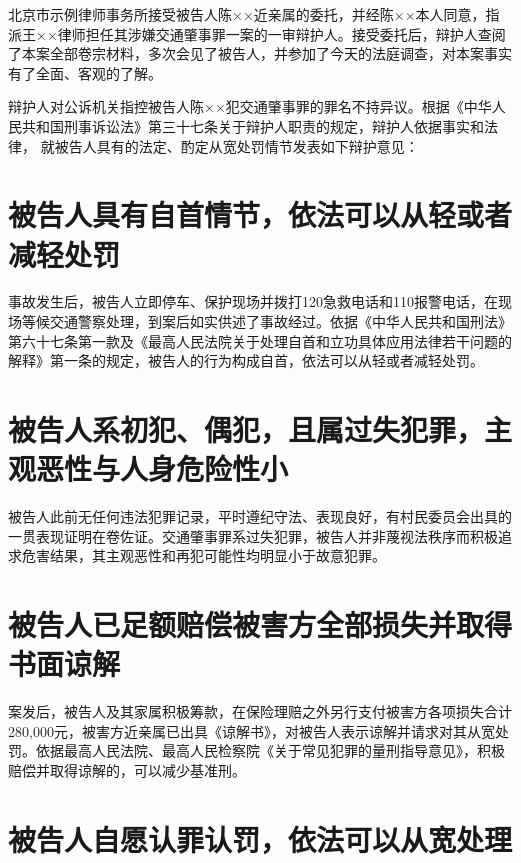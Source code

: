 \documentclass[zihao=-4]{ctexart}
\begin{document}


北京市示例律师事务所接受被告人陈××近亲属的委托，并经陈××本人同意，指
派王××律师担任其涉嫌交通肇事罪一案的一审辩护人。接受委托后，辩护人查阅
了本案全部卷宗材料，多次会见了被告人，并参加了今天的法庭调查，对本案事实
有了全面、客观的了解。

辩护人对公诉机关指控被告人陈××犯交通肇事罪的罪名不持异议。根据《中华人
民共和国刑事诉讼法》第三十七条关于辩护人职责的规定，辩护人依据事实和法律，
就被告人具有的法定、酌定从宽处罚情节发表如下辩护意见：

\section{被告人具有自首情节，依法可以从轻或者减轻处罚}

事故发生后，被告人立即停车、保护现场并拨打120急救电话和110报警电话，在现
场等候交通警察处理，到案后如实供述了事故经过。依据《中华人民共和国刑法》
第六十七条第一款及《最高人民法院关于处理自首和立功具体应用法律若干问题的
解释》第一条的规定，被告人的行为构成自首，依法可以从轻或者减轻处罚。

\section{被告人系初犯、偶犯，且属过失犯罪，主观恶性与人身危险性小}

被告人此前无任何违法犯罪记录，平时遵纪守法、表现良好，有村民委员会出具的
一贯表现证明在卷佐证。交通肇事罪系过失犯罪，被告人并非蔑视法秩序而积极追
求危害结果，其主观恶性和再犯可能性均明显小于故意犯罪。

\section{被告人已足额赔偿被害方全部损失并取得书面谅解}

案发后，被告人及其家属积极筹款，在保险理赔之外另行支付被害方各项损失合计
280,000元，被害方近亲属已出具《谅解书》，对被告人表示谅解并请求对其从宽处
罚。依据最高人民法院、最高人民检察院《关于常见犯罪的量刑指导意见》，积极
赔偿并取得谅解的，可以减少基准刑。

\section{被告人自愿认罪认罚，依法可以从宽处理}
\end{document}

